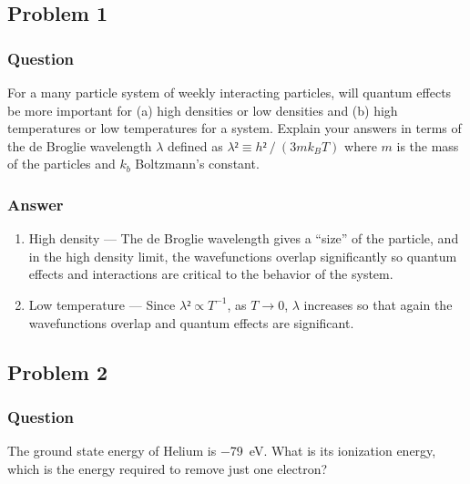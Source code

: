 \subsection{Problem 1}
\subsubsection{Question}

For a many particle system of weekly interacting particles, will quantum
effects be more important for (a) high densities or low densities and (b)
high temperatures or low temperatures for a system. Explain your answers in
terms of the de Broglie wavelength $λ$ defined as $λ² ≡ h²⁄(3mk_BT)$ where
$m$ is the mass of the particles and $k_b$ Boltzmann's constant.

\subsubsection{Answer}
\renewcommand{\labelenumi}{(\alph{enumi})}
\begin{enumerate}
	\item
		High density — The de Broglie wavelength gives a ``size'' of the
		particle, and in the high density limit, the wavefunctions overlap
		significantly so quantum effects and interactions are critical to
		the behavior of the system.
	\item
		Low temperature — Since $λ² \propto T^{-1}$, as $T → 0$, $λ$ increases
		so that again the wavefunctions overlap and quantum effects are
		significant.
\end{enumerate}

\clearpage
\subsection{Problem 2}
\subsubsection{Question}

The ground state energy of Helium is \SI{-79}{\eV}. What is its ionization
energy, which is the energy required to remove just one electron?

